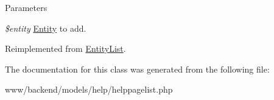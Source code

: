 \begin{DoxyParams}{Parameters}
\item[{\em \$entity}]\hyperlink{classEntity}{Entity} to add. \end{DoxyParams}


Reimplemented from \hyperlink{classEntityList_a65960f27e39a393fb9554f725c333e12}{EntityList}.



The documentation for this class was generated from the following file:\begin{DoxyCompactItemize}
\item 
www/backend/models/help/helppagelist.php\end{DoxyCompactItemize}
